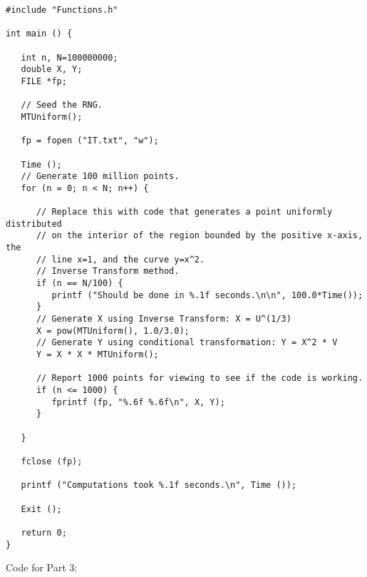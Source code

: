\documentclass{report}
\begin{document}
\begin{lstlisting}[basicstyle=\ttfamily\scriptsize]
#include "Functions.h"

int main () {

   int n, N=100000000;
   double X, Y;
   FILE *fp;

   // Seed the RNG.
   MTUniform();

   fp = fopen ("IT.txt", "w");

   Time ();
   // Generate 100 million points.
   for (n = 0; n < N; n++) {

      // Replace this with code that generates a point uniformly distributed
      // on the interior of the region bounded by the positive x-axis, the
      // line x=1, and the curve y=x^2.
      // Inverse Transform method.
      if (n == N/100) {
         printf ("Should be done in %.1f seconds.\n\n", 100.0*Time());
      }
      // Generate X using Inverse Transform: X = U^(1/3)
      X = pow(MTUniform(), 1.0/3.0); 
      // Generate Y using conditional transformation: Y = X^2 * V
      Y = X * X * MTUniform(); 
      
      // Report 1000 points for viewing to see if the code is working.
      if (n <= 1000) {
         fprintf (fp, "%.6f %.6f\n", X, Y);
      }

   }

   fclose (fp);

   printf ("Computations took %.1f seconds.\n", Time ());

   Exit ();

   return 0;
}

\end{lstlisting}
\pagebreak
Code for Part 3:
\end{document}
